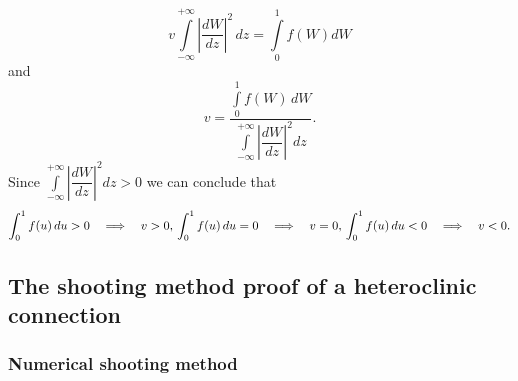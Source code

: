 \documentclass[
  letterpaper,
  DIV=11,
  numbers=noendperiod]{scrreprt}
\theoremstyle{plain}
\theoremstyle{definition}
\theoremstyle{plain}
\theoremstyle{remark}
\begin{document}
\[
 v\int\limits_{-\infty}^{+ \infty} \left|\dfrac{dW}{dz} \right|^2\, dz  =  \int\limits_{0}^{1}f(W) dW 
\] and \[
 v= \dfrac {\int\limits_{0}^{1}f(W) \, dW}{\int\limits_{-\infty}^{+ \infty} \left|\dfrac{dW}{dz} \right|^2 dz}.
\] Since
\(\int\limits_{-\infty}^{+ \infty} \left|\dfrac{dW}{dz} \right|^2 dz >0\)
we can conclude that \[
 \int_{0}^{1}f(u) \, du > 0  \quad  \Longrightarrow  \quad v> 0, \\
  \int_{0}^{1}f(u) \, du =0 \quad  \Longrightarrow  \quad v=0, \\
   \int_{0}^{1}f(u) \, du < 0  \quad  \Longrightarrow \quad v < 0. 
\]

\hypertarget{the-shooting-method-proof-of-a-heteroclinic-connection}{%
\subsection{The shooting method proof of a heteroclinic
connection}\label{the-shooting-method-proof-of-a-heteroclinic-connection}}

\hypertarget{numerical-shooting-method}{%
\subsubsection{Numerical shooting
method}\label{numerical-shooting-method}}
\end{document}

